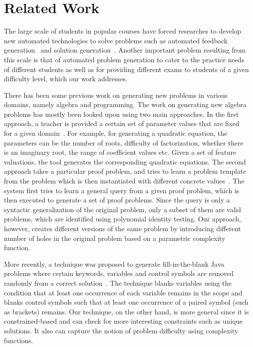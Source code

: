\section{Related Work}

The large scale of students in popular courses have
forced researches to develop new automated technologies to solve problems such
as automated feedback generation~\cite{autograder} and solution
generation~\cite{geometry}. Another important problem resulting
from this scale is that of automated problem generation to cater to
the practice needs of different students as well as for providing
different exams to students of a given difficulty level, which our
work addresses.

There has been some previous work on generating new problems in
various domains, namely algebra and programming. The work on
generating new algebra problems has mostly been looked upon using two
main approaches. In the first approach, a teacher is provided a
certain set of parameter values that are fixed for a given
domain~\cite{jurkovic}. For example, for generating a quadratic
equation, the parameters can be the number of roots, difficulty of
factorization, whether there is an imaginary root, the range of
coefficient values etc. Given a set of feature valuations, the tool
generates the corresponding quadratic equations. The second approach
takes a particular proof problem, and tries to learn a problem
template from the problem which is then instantiated with different
concrete values~\cite{algebra}. The system first tries to learn a
general query from a given proof problem, which is then executed to
generate a set of proof problems. Since the query is only a syntactic
generalization of the original problem, only a subset of them are
valid problems, which are identified using polynomial identity
testing. Our approach, however, creates different versions of the same
problem by introducing different number of holes in the original
problem based on a parametric complexity function.

More recently, a technique was proposed to generate fill-in-the-blank
Java problems where certain keywords, variables and control symbols
are removed randomly from a correct solution~\cite{javablanks}. The
technique blanks variables using the condition that at least one
occurrence of each variable remains in the scope and blanks control
symbols such that at least one occurrence of a paired symbol (such as
brackets) remains. Our technique, on the other hand, is more general
since it is constrained-based and can check for more interesting
constraints such as unique solutions. It also can capture the notion
of problem difficulty using complexity functions.
